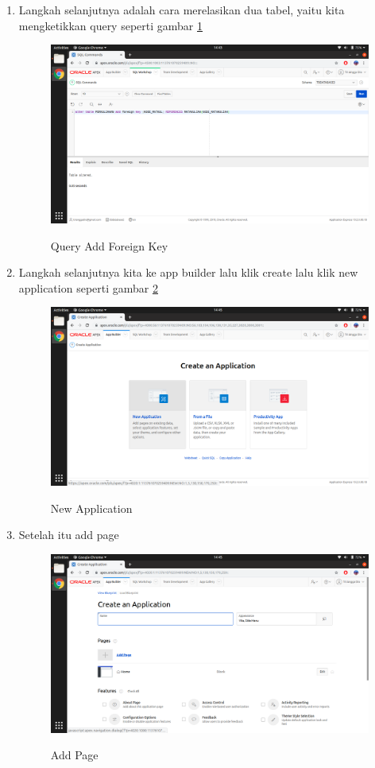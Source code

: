 \begin{enumerate}
\item Langkah selanjutnya adalah cara merelasikan dua tabel, yaitu kita mengketikkan query seperti gambar \ref{21}
\begin{figure}[H]
\centering
\caption{Query Add Foreign Key}
\includegraphics[width=1\textwidth]{figures/21}
\label{21}
\end{figure}

\item Langkah selanjutnya kita ke app builder lalu klik create lalu klik new application seperti gambar \ref{24}
\begin{figure}[H]
\centering
\caption{New Application}
\includegraphics[width=1\textwidth]{figures/24}
\label{24}
\end{figure}

\item Setelah itu add page
\begin{figure}[H]
\centering
\caption{Add Page}
\includegraphics[width=1\textwidth]{figures/25}
\label{25}
\end{figure}


\end{enumerate}
